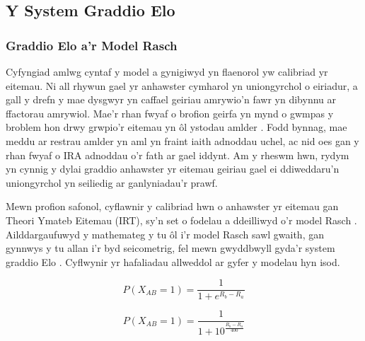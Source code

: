 \subsection{Y System Graddio Elo}
        \subsubsection{Graddio Elo a'r Model Rasch}
Cyfyngiad amlwg cyntaf y model a gynigiwyd yn flaenorol yw calibriad yr eitemau. Ni all rhywun gael yr anhawster cymharol yn uniongyrchol o eiriadur, a gall y drefn y mae dysgwyr yn caffael geiriau amrywio'n fawr yn dibynnu ar ffactorau amrywiol. Mae'r rhan fwyaf o brofion geirfa yn mynd o gwmpas y broblem hon drwy grwpio'r eitemau yn ôl ystodau amlder \parencite{nation_teaching_1990, meara_complexities_1994, dudley_context-aligned_2024}. Fodd bynnag, mae meddu ar restrau amlder yn aml yn fraint iaith adnoddau uchel, ac nid oes gan y rhan fwyaf o IRA adnoddau o'r fath ar gael iddynt. Am y rheswm hwn, rydym yn cynnig y dylai graddio anhawster yr eitemau geiriau gael ei ddiweddaru'n uniongyrchol yn seiliedig ar ganlyniadau'r prawf.

Mewn profion safonol, cyflawnir y calibriad hwn o anhawster yr eitemau gan Theori Ymateb Eitemau (IRT), sy'n set o fodelau a ddeilliwyd o'r model Rasch \parencite{rasch_probabilistic_1980}. Ailddargaufuwyd y mathemateg y tu ôl i'r model Rasch sawl gwaith, gan gynnwys y tu allan i'r byd seicometrig, fel mewn gwyddbwyll gyda'r system graddio Elo \parencite{elo_uscf_1961, elo_rating_1986}. Cyflwynir yr hafaliadau allweddol ar gyfer y modelau hyn isod.

\begin{figure}[h]
    \centering
    \begin{minipage}{0.45\textwidth}
        \centering
            $$P(X_{AB} = 1)=\frac{1}{1+e^{R_b-R_a}}$$
    \end{minipage}
    \hfill
    \begin{minipage}{0.45\textwidth}
        \centering
            $$P(X_{AB} = 1)=\frac{1}{1+10^{\frac{R_b-R_a}{400}}}$$
        \label{Elo}
    \end{minipage}
\end{figure}

